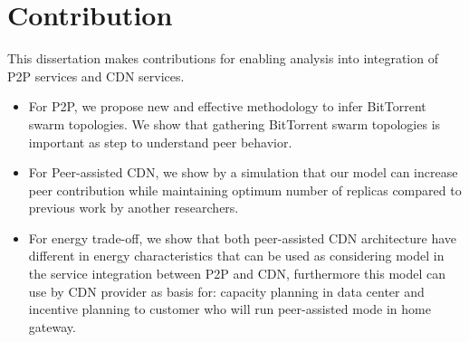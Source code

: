 \section{Contribution}
This dissertation makes contributions for enabling analysis into integration of P2P services and CDN services.
\begin{itemize}
	\item For P2P, we propose new and effective methodology to infer BitTorrent swarm topologies. 
	We show that gathering BitTorrent swarm topologies is important as step to understand peer behavior. 
	\item For Peer-assisted CDN, we show by a simulation that our model can increase peer contribution while maintaining optimum number of replicas compared to previous work by another researchers.
	\item For energy trade-off, we show that both peer-assisted CDN architecture have different in energy characteristics that can be used as considering model in the service integration between P2P and CDN, furthermore this model can use by CDN provider as basis for: capacity planning in data center and incentive planning to customer who will run peer-assisted mode in home gateway.
\end{itemize}
